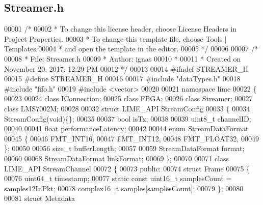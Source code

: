 \subsection{Streamer.\+h}
\label{Streamer_8h_source}

\begin{DoxyCode}
00001 \textcolor{comment}{/*}
00002 \textcolor{comment}{ * To change this license header, choose License Headers in Project Properties.}
00003 \textcolor{comment}{ * To change this template file, choose Tools | Templates}
00004 \textcolor{comment}{ * and open the template in the editor.}
00005 \textcolor{comment}{ */}
00006 
00007 \textcolor{comment}{/*}
00008 \textcolor{comment}{ * File:   Streamer.h}
00009 \textcolor{comment}{ * Author: ignas}
00010 \textcolor{comment}{ *}
00011 \textcolor{comment}{ * Created on November 20, 2017, 12:29 PM}
00012 \textcolor{comment}{ */}
00013 
00014 \textcolor{preprocessor}{#ifndef STREAMER\_H}
00015 \textcolor{preprocessor}{#define STREAMER\_H}
00016 
00017 \textcolor{preprocessor}{#include "dataTypes.h"}
00018 \textcolor{preprocessor}{#include "fifo.h"}
00019 \textcolor{preprocessor}{#include <vector>}
00020 
00021 \textcolor{keyword}{namespace }lime
00022 \{
00023 
00024 \textcolor{keyword}{class }IConnection;
00025 \textcolor{keyword}{class }FPGA;
00026 \textcolor{keyword}{class }Streamer;
00027 \textcolor{keyword}{class }LMS7002M;
00028 
00032 \textcolor{keyword}{struct }LIME_API StreamConfig
00033 \{
00034     StreamConfig(\textcolor{keywordtype}{void})\{\};
00035 
00037     \textcolor{keywordtype}{bool} isTx;
00038 
00039     uint8\_t channelID;
00040 
00041     \textcolor{keywordtype}{float} performanceLatency;
00042 
00044     \textcolor{keyword}{enum} StreamDataFormat
00045     \{
00046         FMT_INT16,
00047         FMT_INT12,
00048         FMT_FLOAT32,
00049     \};
00050 
00056     \textcolor{keywordtype}{size\_t} bufferLength;
00057 
00059     StreamDataFormat format;
00060 
00068     StreamDataFormat linkFormat;
00069 \};
00070 
00071 \textcolor{keyword}{class }LIME_API StreamChannel
00072 \{
00073 \textcolor{keyword}{public}:
00074     \textcolor{keyword}{struct }Frame
00075     \{
00076         uint64\_t timestamp;
00077         \textcolor{keyword}{static} \textcolor{keyword}{const} uint16\_t samplesCount = samples12InPkt;
00078         complex16_t samples[samplesCount];
00079     \};
00080 
00081     \textcolor{keyword}{struct }Metadata

\end{DoxyCode}
